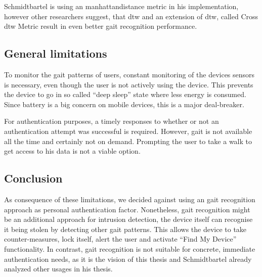 Schmidtbartel is using an \gls{manhattandistance} metric in his implementation, however other researchers \cite{derawi2013gait} suggest, that \gls{dtw} and an extension of \gls{dtw}, called Cross \gls{dtw} Metric result in even better gait recognition performance.

\subsection{General limitations}
To monitor the gait patterns of users, constant monitoring of the devices sensors is necessary, even though the user is not actively using the device. This prevents the device to go in so called ``deep sleep'' state where less energy is consumed. Since battery is a big concern on mobile devices, this is a major deal-breaker. 

For authentication purposes, a timely responses to whether or not an authentication attempt was successful is required. However, gait is not available all the time and certainly not on demand. Prompting the user to take a walk to get access to his data is not a viable option.

\subsection{Conclusion}
As consequence of these limitations, we decided against using an gait recognition approach as personal authentication factor. Nonetheless, gait recognition might be an additional approach for intrusion detection, \eg the device itself can recognise it being stolen by detecting other gait patterns. This allows the device to take counter-measures, \eg lock itself, alert the user and activate ``Find My Device'' functionality. 
In contrast, gait recognition is not suitable for concrete, immediate authentication needs, as it is the vision of this thesis and Schmidtbartel already analyzed other usages in his thesis.